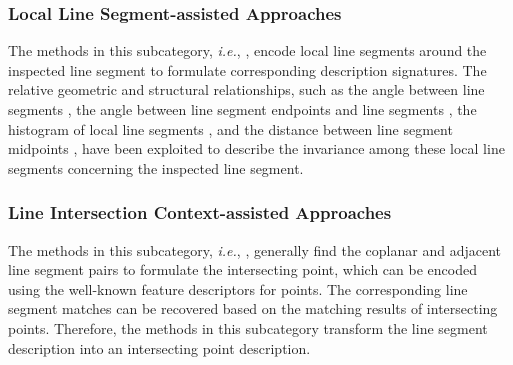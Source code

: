 \documentclass[journal,compsoc]{IEEEtran}
\begin{document}
\subsubsection{Local Line Segment-assisted Approaches} \label{subsec_description_structure_local_line} The methods in this subcategory, \textit{i.e.}, \cite{WidebaselineimagematchingusingLineSignatures,Robustaffineinvariantlinematchingforhighresolutionremotesensingimages,Anovelsimilarityinvariantlinedescriptorforgeometricmapregistration,NovelSimilarityInvariantLineDescriptorandMatchingAlgorithmforGlobalMotionEstimation,Twoviewlinematchingalgorithmbasedoncontextandappearanceinlowtexturedimages,AutomaticRegistrationMethodforOpticalRemoteSensingImageswithLargeBackgroundVariationsUsingLineSegments,MultimodalImageRegistrationWithLineSegmentsbySelectiveSearch}, encode local line segments around the inspected line segment to formulate corresponding description signatures. The relative geometric and structural relationships, such as the angle between line segments \cite{Anovelsimilarityinvariantlinedescriptorforgeometricmapregistration,NovelSimilarityInvariantLineDescriptorandMatchingAlgorithmforGlobalMotionEstimation}, the angle between line segment endpoints and line segments \cite{Anovelsimilarityinvariantlinedescriptorforgeometricmapregistration,NovelSimilarityInvariantLineDescriptorandMatchingAlgorithmforGlobalMotionEstimation}, the histogram of local line segments \cite{AutomaticRegistrationMethodforOpticalRemoteSensingImageswithLargeBackgroundVariationsUsingLineSegments}, and the distance between line segment midpoints \cite{Twoviewlinematchingalgorithmbasedoncontextandappearanceinlowtexturedimages}, have been exploited to describe the invariance among these local line segments concerning the inspected line segment.

\subsubsection{Line Intersection Context-assisted Approaches} \label{subsec_description_structure_context} The methods in this subcategory, \textit{i.e.}, \cite{Anovellinematchingmethodbasedonintersectioncontext,Simultaneouslinematchingandepipolargeometryestimationbasedontheintersectioncontextofcoplanarlinepairs,LineMatchinginWideBaselineStereoATopDownApproach,Widebaselinestereomatchingbasedonthelineintersectioncontextforrealtimeworkspacemodeling,RobustLineMatchingBasedonRay-Point-RayStructureDescriptor,HierarchicalLineMatchingBasedonLineJunctionLineStructureDescriptorandLocalHomographyEstimation,Linesegmentmatchingandreconstructionviaexploitingcoplanarcues}, generally find the coplanar and adjacent line segment pairs to formulate the intersecting point, which can be encoded using the well-known feature descriptors for points. The corresponding line segment matches can be recovered based on the matching results of intersecting points. Therefore, the methods in this subcategory transform the line segment description into an intersecting point description.
\end{document}
